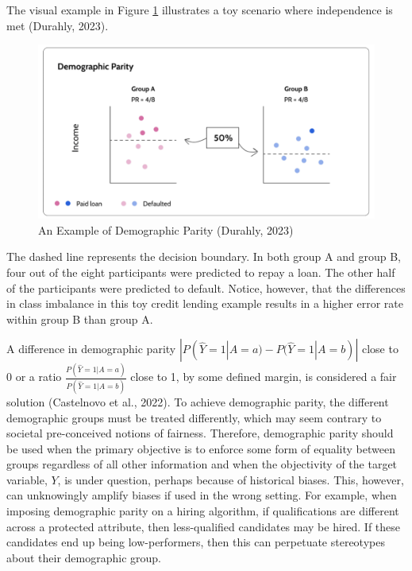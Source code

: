 \documentclass[12pt, twoside]{amherstthesis}
\begin{document}
The visual example in Figure \ref{fig:dp} illustrates a toy scenario where independence is met (Durahly, 2023).
\begin{figure}

{\centering \includegraphics[width=1\linewidth]{figures/dp} 

}

\caption[An Example of Demographic Parity]{An Example of Demographic Parity (Durahly, 2023)}\label{fig:dp}
\end{figure}
The dashed line represents the decision boundary. In both group A and group B, four out of the eight participants were predicted to repay a loan. The other half of the participants were predicted to default. Notice, however, that the differences in class imbalance in this toy credit lending example results in a higher error rate within group B than group A.

A difference in demographic parity \(|P(\hat{Y} = 1 | A = a) - P(\hat{Y} = 1 | A = b)|\) close to 0 or a ratio \(\frac{P(\hat{Y} = 1 | A = a)}{P(\hat{Y} = 1 | A = b)}\) close to 1, by some defined margin, is considered a fair solution (Castelnovo et al., 2022). To achieve demographic parity, the different demographic groups must be treated differently, which may seem contrary to societal pre-conceived notions of fairness. Therefore, demographic parity should be used when the primary objective is to enforce some form of equality between groups regardless of all other information and when the objectivity of the target variable, \(Y\), is under question, perhaps because of historical biases. This, however, can unknowingly amplify biases if used in the wrong setting. For example, when imposing demographic parity on a hiring algorithm, if qualifications are different across a protected attribute, then less-qualified candidates may be hired. If these candidates end up being low-performers, then this can perpetuate stereotypes about their demographic group.
\end{document}
